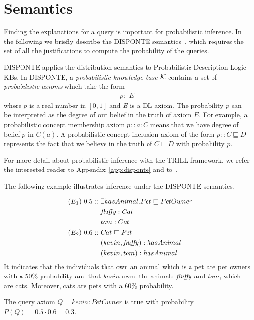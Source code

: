 \section{Semantics}
\label{semantics}

Finding the explanations for a query is important for probabilistic inference. In the following we briefly describe the DISPONTE semantics~\cite{RigBelLamZes15-SW-IJ}, which requires the set of all the justifications to compute the probability of the queries.

DISPONTE \cite{RigBelLamZes15-SW-IJ,Zese17-SSW-BK} applies the distribution semantics \cite{DBLP:conf/iclp/Sato95} to Probabilistic Description Logic KBs.
In DISPONTE, a \emph{probabilistic knowledge base} ${\cal K}$ contains a set of \emph{probabilistic axioms} which take the form
\begin{align}
& p::E\label{pax} &
\end{align}
where $p$ is a real number in $[0,1]$ and $E$ is a DL axiom. 
The probability $p$ can be interpreted as the degree of our belief in the truth of axiom $E$. 
For example, a probabilistic concept membership axiom
$
p::a:C
$
means that we have degree of belief $p$ in $C(a)$.
A probabilistic concept inclusion axiom of the form
$
p::C\sqsubseteq D
$
represents the fact that  we believe in the truth of $C \sqsubseteq D$ with probability $p$. 

For more detail about probabilistic inference with the TRILL framework, we refer the interested reader to Appendix~\ref{app:disponte} and to~\cite{ZesBelCot18-TPLP-IJ}.

The following example illustrates inference under the DISPONTE semantics.
\begin{example}
	
	\begin{align*}
	&& (E_1)\ 0.5 ::\ & \exists hasAnimal.Pet \sqsubseteq PetOwner\\
	&& 				& {\mathit{fluffy}}: Cat \\
	&& 				& tom: Cat \\
	&& (E_2)\ 0.6 ::\ & Cat\sqsubseteq Pet\\
	&& 				& (kevin,{\mathit{fluffy}}):hasAnimal \\
	&& 				& (kevin,tom):hasAnimal
	\end{align*}
	It indicates that the individuals that own an animal which is a pet are pet owners with a 50\% probability and that $kevin$ owns the animals ${\mathit{fluffy}}$ and $tom$, which are cats.
	Moreover, cats are pets with a 60\% probability.

	The query axiom $Q=kevin:PetOwner$ is true with probability $P(Q)=0.5\cdot 0.6=0.3$.
\end{example}

